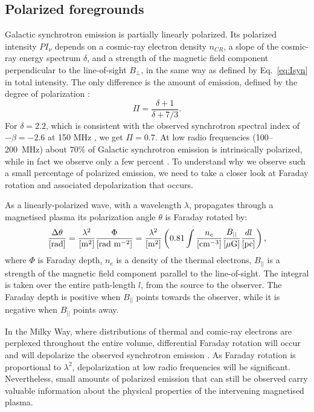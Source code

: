 \subsection{Polarized foregrounds}\label{sec:polarfg}
Galactic synchrotron emission is partially linearly polarized. Its polarized intensity $PI_\nu$ depends on a cosmic-ray electron density $n_{CR}$, a slope of the cosmic-ray energy spectrum $\delta$, and a strength of the magnetic field component perpendicular to the line-of-sight $B_\perp$, in the same way as defined by Eq.~\ref{eq:Isyn} in total intensity. The only difference is the amount of emission, defined by the degree of polarization \cite{rybicki86}:
\begin{equation}
\Pi=\frac{\delta+1}{\delta+7/3}.
\end{equation}
For $\delta=2.2$, which is consistent with the observed synchrotron spectral index of $-\beta=-2.6$ at 150 MHz \cite{mozdzen17}, we get $\Pi=0.7$. At low radio frequencies  (100--200~MHz) about $70\%$ of Galactic synchrotron emission is intrinsically polarized, while in fact we observe only a few percent \cite{bernardi13, jelic14, jelic15, lenc17, lenc16, vaneck19, vaneck17}. To understand why we observe such a small percentage of polarized emission, we need to take a closer look at Faraday rotation and associated depolarization that occurs. 

As a linearly-polarized wave, with a wavelength $\lambda$, propagates through a magnetised plasma its polarization angle $\theta$ is Faraday rotated by:
\begin{equation}\label{eq:FR}
\frac{\Delta \theta}{\rm [rad]}= \frac{\lambda^2}{\rm [m^2]}\frac{\Phi}{\rm [rad~m^{-2}]}=  \frac{\lambda^2}{\rm [m^2]}\left(0.81\int \frac{n_e}{\rm [cm^{-3}]} \frac{B_{||}}{\rm [\mu G]} \frac{dl}{\rm [pc]}\right),
\end{equation}
where $\Phi$ is Faraday depth, $n_e$ is a density of the thermal electrons, $B_{||}$ is a strength of the magnetic field component parallel to the line-of-sight. The integral is taken over the entire path-length $l$, from the source to the observer.  The Faraday depth is positive when $B_{||}$ points towards the observer, while it is negative when $B_{||}$ points away.

In the Milky Way, where distributions of thermal and comic-ray electrons are perplexed throughout the entire volume, differential Faraday rotation will occur and will depolarize the observed synchrotron emission \cite{sokoloff98}.  As Faraday rotation is proportional to $\lambda^2$, depolarization at low radio frequencies will be significant. 
Nevertheless, small amounts of polarized emission that can still be observed carry valuable information about the physical properties of the intervening magnetised plasma.

